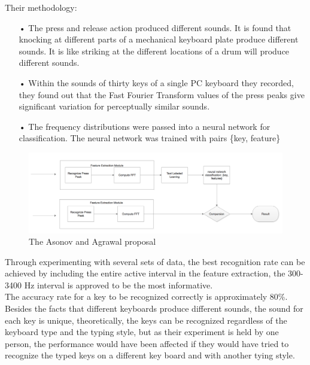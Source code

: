 \documentclass[12pt,a4paper]{article}
\begin{document}
Their methodology:
\begin{itemize}
\item[•] The press and release action produced different sounds. It is found that knocking at different parts of a mechanical keyboard plate produce different sounds. It is like striking at the different locations of a drum will produce different sounds.\\
\item[•] Within the sounds of thirty keys of a single PC keyboard they recorded, they found out that the Fast Fourier Transform values of the press peaks give significant variation for perceptually similar sounds.\\
\item[•] The frequency distributions were passed into a neural network for classification.  The neural network was trained with pairs \{key, feature\}\\
\end{itemize}

\begin{figure}[h]
\begin{center}
        \includegraphics[scale=0.55]{aaModel.png}
        \caption{The Asonov and Agrawal proposal}
        \label{fig:3}
\end{center}
\end{figure} \par
\FloatBarrier

Through experimenting with several sets of data, the best recognition rate can be achieved by including the entire active interval in the feature extraction, the 300-3400 Hz interval is approved to be the most informative.\\

The accuracy rate for a key to be recognized correctly is approximately 80\%. Besides the facts that different keyboards produce different sounds, the sound for each key is unique, theoretically, the keys can be recognized regardless of the keyboard type and the typing style, but as their experiment is held by one person, the performance would have been affected if they would have tried to recognize the typed keys on a different key board and with another tying style.\\
\end{document}
